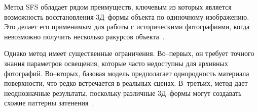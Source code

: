 Метод SFS обладает рядом преимуществ, ключевым из которых является возможность восстановления 3Д--формы объекта по одиночному изображению.
Это делает его применимым для работы с историческими фотографиями, когда невозможно получить несколько ракурсов объекта~\cite{zhang2025review}.

Однако метод имеет существенные ограничения.
Во--первых, он требует точного знания параметров освещения, которые часто недоступны для архивных фотографий.
Во--вторых, базовая модель предполагает однородность материала поверхности, что редко встречается в реальных сценах.
В--третьих, метод дает неоднозначные результаты, поскольку различные 3Д--формы могут создавать схожие паттерны затенения~\cite{zhang2025review}.


